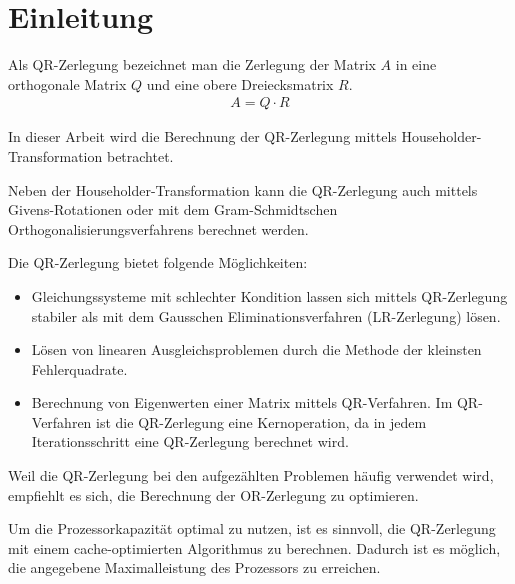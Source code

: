 \chapter{Einleitung}
Als QR-Zerlegung bezeichnet man die Zerlegung der Matrix $A$ in eine  orthogonale Matrix $Q$ und eine obere Dreiecksmatrix $R$.
\begin{align*}
	A = Q \cdot R
\end{align*} 

In dieser Arbeit wird die Berechnung der QR-Zerlegung mittels Householder-Transformation betrachtet. 

Neben der Householder-Transformation kann die QR-Zerlegung auch mittels Givens-Rotationen oder mit dem Gram-Schmidtschen Orthogonalisierungsverfahrens berechnet werden.

Die QR-Zerlegung bietet folgende Möglichkeiten:
\begin{itemize}
	\item Gleichungssysteme mit schlechter Kondition lassen sich mittels QR-Zerlegung stabiler als mit dem Gausschen Eliminationsverfahren (LR-Zerlegung) lösen. 

	\item Lösen von linearen Ausgleichsproblemen durch die Methode der kleinsten Fehlerquadrate. 
	
	
	\item Berechnung von Eigenwerten einer Matrix mittels QR-Verfahren. Im QR-Verfahren ist die QR-Zerlegung eine Kernoperation, da in jedem Iterationsschritt eine QR-Zerlegung berechnet wird.
\end{itemize}


Weil die QR-Zerlegung bei den aufgezählten Problemen häufig verwendet wird, empfiehlt es sich, die Berechnung der OR-Zerlegung zu optimieren.

Um die Prozessorkapazität optimal zu nutzen, ist es sinnvoll, die QR-Zerlegung mit einem cache-optimierten Algorithmus zu berechnen.
Dadurch ist es möglich, die angegebene Maximalleistung des Prozessors zu erreichen.


